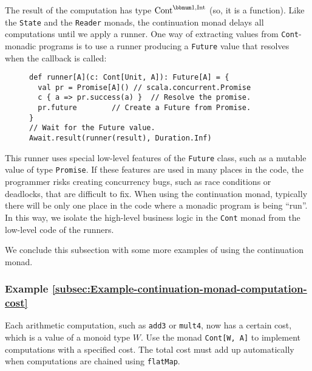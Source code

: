 The result of the computation has type $\text{Cont}^{\bbnum 1,\text{Int}}$
(so, it is a function). Like the \lstinline!State! and the \lstinline!Reader!
monads, the continuation monad delays all computations until we apply
a runner. One way of extracting values from
\lstinline!Cont!-monadic programs is to use a runner producing a
\lstinline!Future! value that resolves when the callback is called:

\begin{wrapfigure}{l}{0.515\columnwidth}%
\vspace{-0.8\baselineskip}
\begin{lstlisting}
def runner[A](c: Cont[Unit, A]): Future[A] = {
  val pr = Promise[A]() // scala.concurrent.Promise
  c { a => pr.success(a) }  // Resolve the promise.
  pr.future        // Create a Future from Promise.
}
// Wait for the Future value.
Await.result(runner(result), Duration.Inf)
\end{lstlisting}

\vspace{-1\baselineskip}
\end{wrapfigure}%

\noindent This runner uses special low-level features of the \lstinline!Future!
class, such as a mutable value of type \lstinline!Promise!. If these
features are used in many places in the code, the programmer risks
creating concurrency bugs, such as race conditions or deadlocks, that
are difficult to fix. When using the continuation monad, typically
there will be only one place in the code where a monadic program is
being \textsf{``}run\textsf{''}. In this way, we isolate the high-level business logic
in the \lstinline!Cont! monad from the low-level code of the runners.

We conclude this subsection with some more examples of using the continuation
monad.

\subsubsection{Example \label{subsec:Example-continuation-monad-computation-cost}\ref{subsec:Example-continuation-monad-computation-cost}}

Each arithmetic computation, such as \lstinline!add3! or \lstinline!mult4!,
now has a certain cost, which is a value of a monoid type $W$. Use
the monad \lstinline!Cont[W, A]! to implement computations with a
specified cost. The total cost must add up automatically when computations
are chained using \lstinline!flatMap!.

